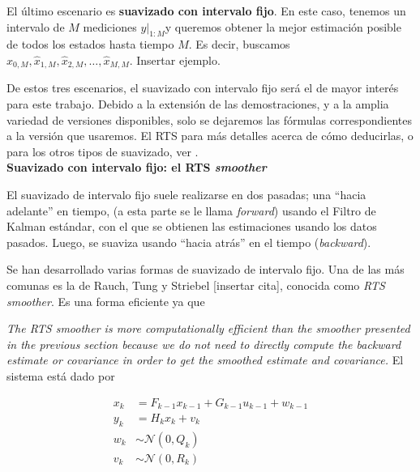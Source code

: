 El último escenario es \textbf{suavizado con intervalo fijo}. En este caso, tenemos un intervalo de \(M\) mediciones \(\left. y \right|_{1:M}\)y queremos obtener la mejor estimación posible de todos los estados hasta tiempo \(M\). Es decir, buscamos \(\hat{x}_{0,M}, \hat{x}_{1,M}, \hat{x}_{2,M}, \dots, \hat{x}_{M,M}\). Insertar ejemplo.

De estos tres escenarios, el suavizado con intervalo fijo será el de mayor interés para este trabajo. Debido a la extensión de las demostraciones, y a la amplia variedad de versiones disponibles, solo se dejaremos las fórmulas correspondientes a la versión que usaremos. El RTS  para más detalles acerca de cómo deducirlas, o para los otros tipos de suavizado, ver \cite{Simon2006}.  \\ 

\noindent \textbf{Suavizado con intervalo fijo: el RTS \textit{smoother}} 



El suavizado de intervalo fijo suele realizarse en dos pasadas; una ``hacia adelante'' en tiempo, (a esta parte se le llama \textit{forward}) usando el Filtro de Kalman estándar, con el que se obtienen las estimaciones usando los datos pasados. Luego, se suaviza usando ``hacia atrás'' en el tiempo (\textit{backward}).

Se han desarrollado varias formas de suavizado de intervalo fijo. Una de las más comunas es la de Rauch, Tung y Striebel [insertar cita], conocida como \textit{RTS smoother}. Es una forma eficiente ya que 

\textit{The RTS smoother is more computationally efficient than the smoother presented in the previous section because we do not need to directly compute the backward estimate or covariance in order to get the smoothed estimate and covariance. }
El sistema está dado por 

\[
\begin{aligned}
x_k &= F_{k-1}x_{k-1} + G_{k-1}u_{k-1} + w_{k-1} \\ 
y_k &= H_k x_k + v_k \\ 
w_k &\sim  \mathcal{N}(0, Q_k)\\
v_k &\sim  \mathcal{N}(0, R_k)
\end{aligned}
\] 

